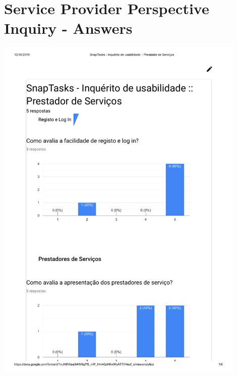 \chapter{Service Provider Perspective Inquiry - Answers} %

\label{AppendixG} 

 \includegraphics[page=1,origin=c, width=0.9\textwidth ]{appendices/files/InquiryServiceProvidersAnswers.pdf}

\pagebreak

